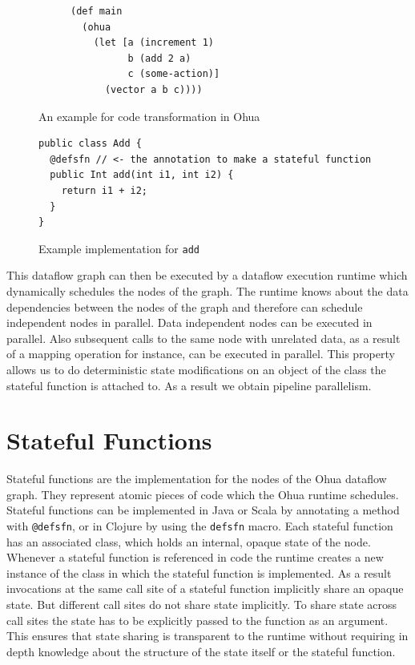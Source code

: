 \begin{figure}[h]
  \begin{subfigure}{.5\textwidth}
\begin{verbatim}
(def main
  (ohua
    (let [a (increment 1)
          b (add 2 a)
          c (some-action)]
      (vector a b c))))
\end{verbatim}
  \end{subfigure}
  \begin{subfigure}{.5\textwidth}
  \end{subfigure}

\caption{An example for code transformation in Ohua}
\label{fig:ohua-code-example}
\end{figure}

\begin{figure}[h]
\begin{verbatim}
public class Add {
  @defsfn // <- the annotation to make a stateful function
  public Int add(int i1, int i2) {
    return i1 + i2;
  }
}
\end{verbatim}
\caption{Example implementation for \texttt{add}}
\label{fig:ohua-sfn-example}
\end{figure}

This dataflow graph can then be executed by a dataflow execution runtime which dynamically schedules the nodes of the graph.
The runtime knows about the data dependencies between the nodes of the graph and therefore can schedule independent nodes in parallel.
Data independent nodes can be executed in parallel.
Also subsequent calls to the same node with unrelated data, as a result of a mapping operation for instance, can be executed in parallel.
This property allows us to do deterministic state modifications on an object of the class the stateful function is attached to.
As a result we obtain pipeline parallelism.

\section{Stateful Functions}

\label{sec:stateful-functions}

Stateful functions are the implementation for the nodes of the Ohua dataflow graph.
They represent atomic pieces of code which the Ohua runtime schedules.
Stateful functions can be implemented in Java or Scala\cite{ScalaLanguage} by annotating a method with \texttt{@defsfn}, or in Clojure by using the \texttt{defsfn} macro.
Each stateful function has an associated class, which holds an internal, opaque state of the node.
Whenever a stateful function is referenced in code the runtime creates a new instance of the class in which the stateful function is implemented.
As a result invocations at the same call site of a stateful function implicitly share an opaque state.
But different call sites do not share state implicitly.
To share state across call sites the state has to be explicitly passed to the function as an argument.
This ensures that state sharing is transparent to the runtime without requiring in depth knowledge about the structure of the state itself or the stateful function.

